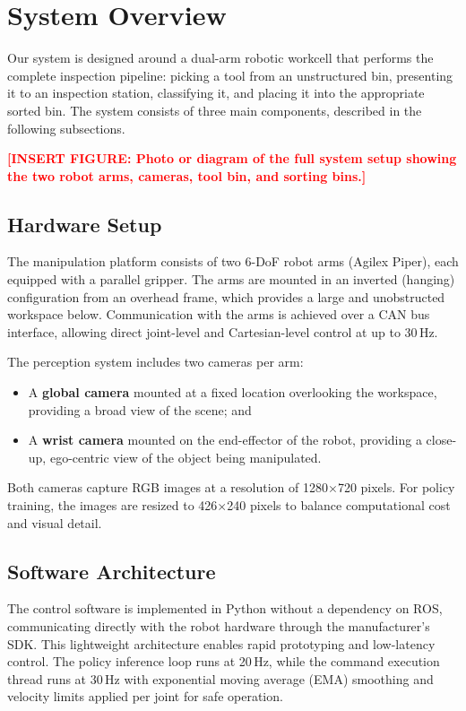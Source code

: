 \documentclass[conference]{IEEEtran}
\newcommand{\placeholder}[1]{\textcolor{red}{\textbf{[#1]}}}
\begin{document}
\section{System Overview}

Our system is designed around a dual-arm robotic workcell that performs the complete inspection pipeline: picking a tool from an unstructured bin, presenting it to an inspection station, classifying it, and placing it into the appropriate sorted bin. The system consists of three main components, described in the following subsections.

\placeholder{INSERT FIGURE: Photo or diagram of the full system setup showing the two robot arms, cameras, tool bin, and sorting bins.}

\subsection{Hardware Setup}

The manipulation platform consists of two 6-DoF robot arms (Agilex Piper), each equipped with a parallel gripper. The arms are mounted in an inverted (hanging) configuration from an overhead frame, which provides a large and unobstructed workspace below. Communication with the arms is achieved over a CAN bus interface, allowing direct joint-level and Cartesian-level control at up to 30\,Hz.

The perception system includes two cameras per arm:
\begin{itemize}
    \item A \textbf{global camera} mounted at a fixed location overlooking the workspace, providing a broad view of the scene; and
    \item A \textbf{wrist camera} mounted on the end-effector of the robot, providing a close-up, ego-centric view of the object being manipulated.
\end{itemize}

Both cameras capture RGB images at a resolution of 1280$\times$720 pixels. For policy training, the images are resized to 426$\times$240 pixels to balance computational cost and visual detail.

\subsection{Software Architecture}

The control software is implemented in Python without a dependency on ROS, communicating directly with the robot hardware through the manufacturer's SDK. This lightweight architecture enables rapid prototyping and low-latency control. The policy inference loop runs at 20\,Hz, while the command execution thread runs at 30\,Hz with exponential moving average (EMA) smoothing and velocity limits applied per joint for safe operation.
\end{document}
